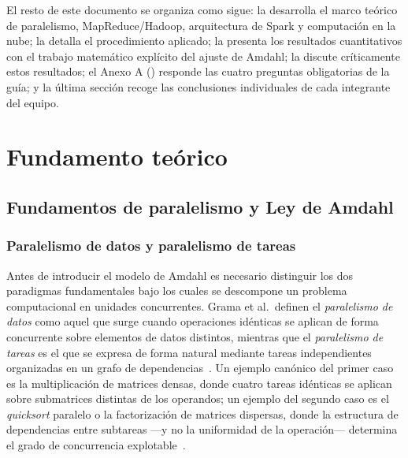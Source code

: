 \documentclass[11pt,a4paper]{article}
\begin{document}
    El resto de este documento se organiza como sigue: la  desarrolla
    el marco teórico de paralelismo, MapReduce/Hadoop, arquitectura de Spark y computación en la
    nube; la  detalla el procedimiento aplicado; la
     presenta los resultados cuantitativos con el trabajo matemático explícito
    del ajuste de Amdahl; la  discute críticamente estos resultados; el
    Anexo A () responde las cuatro preguntas obligatorias de la guía; y
    la última sección recoge las conclusiones individuales de cada integrante del equipo.

    \section{Fundamento teórico}
    \label{sec:fundamento-teorico}


    \subsection{Fundamentos de paralelismo y Ley de Amdahl}
    \label{sec:fundamento-amdahl}

    \subsubsection{Paralelismo de datos y paralelismo de tareas}

    Antes de introducir el modelo de Amdahl es necesario distinguir los dos
    paradigmas fundamentales bajo los cuales se descompone un problema
    computacional en unidades concurrentes. Grama et al.\ definen el
    \emph{paralelismo de datos} como aquel que surge cuando operaciones
    idénticas se aplican de forma concurrente sobre elementos de datos
    distintos, mientras que el \emph{paralelismo de tareas} es el que se
    expresa de forma natural mediante tareas independientes organizadas en
    un grafo de dependencias~\autocite{grama2003}. Un ejemplo canónico del
    primer caso es la multiplicación de matrices densas, donde cuatro
    tareas idénticas se aplican sobre submatrices distintas de los
    operandos; un ejemplo del segundo caso es el \emph{quicksort} paralelo
    o la factorización de matrices dispersas, donde la estructura de
    dependencias entre subtareas —y no la uniformidad de la operación—
    determina el grado de concurrencia explotable~\autocite{grama2003}.
\end{document}
